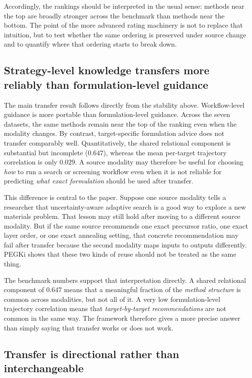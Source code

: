 \documentclass[twoside,twocolumn,9pt]{article}
\begin{document}
Accordingly, the rankings should be interpreted in the usual sense: methods near the top are broadly stronger across the benchmark than methods near the bottom. The point of the more advanced rating machinery is not to replace that intuition, but to test whether the same ordering is preserved under source change and to quantify where that ordering starts to break down.

\subsection{Strategy-level knowledge transfers more reliably than formulation-level guidance}

The main transfer result follows directly from the stability above. Workflow-level guidance is more portable than formulation-level guidance. Across the seven datasets, the same methods remain near the top of the ranking even when the modality changes. By contrast, target-specific formulation advice does not transfer comparably well. Quantitatively, the shared relational component is substantial but incomplete ($0.647$), whereas the mean per-target trajectory correlation is only $0.029$. A source modality may therefore be useful for choosing \emph{how} to run a search or screening workflow even when it is not reliable for predicting \emph{what exact formulation} should be used after transfer.

This difference is central to the paper. Suppose one source modality tells a researcher that uncertainty-aware adaptive search is a good way to explore a new materials problem. That lesson may still hold after moving to a different source modality. But if the same source recommends one exact precursor ratio, one exact layer order, or one exact annealing setting, that concrete recommendation may fail after transfer because the second modality maps inputs to outputs differently. PEGKi shows that these two kinds of reuse should not be treated as the same thing.

The benchmark numbers support that interpretation directly. A shared relational component of $0.647$ means that a meaningful fraction of the \emph{method structure} is common across modalities, but not all of it. A very low formulation-level trajectory correlation means that \emph{target-by-target recommendations} are not common in the same way. The framework therefore gives a more precise answer than simply saying that transfer works or does not work.

\subsection{Transfer is directional rather than interchangeable}
\end{document}
